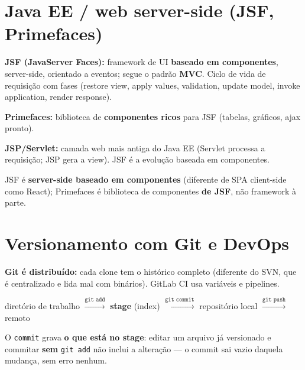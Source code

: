\section{Java EE / web server-side (JSF, Primefaces)}

\textbf{JSF (JavaServer Faces):} framework de UI \textbf{baseado em
componentes}, server-side, orientado a eventos; segue o padrão \textbf{MVC}.
Ciclo de vida de requisição com fases (restore view, apply values,
validation, update model, invoke application, render response).

\textbf{Primefaces:} biblioteca de \textbf{componentes ricos} para JSF
(tabelas, gráficos, ajax pronto).

\textbf{JSP/Servlet:} camada web mais antiga do Java EE (Servlet processa a
requisição; JSP gera a view). JSF é a evolução baseada em componentes.

\begin{pegadinha}
JSF é \textbf{server-side baseado em componentes} (diferente de SPA
client-side como React); Primefaces é biblioteca de componentes \textbf{de
JSF}, não framework à parte.
\end{pegadinha}

\section{Versionamento com Git e DevOps}
\label{sec:git-devops}

\textbf{Git é distribuído:} cada clone tem o histórico completo (diferente
do SVN, que é centralizado e lida mal com binários). GitLab CI usa variáveis
e pipelines.

\begin{conceito}
\begin{center}
diretório de trabalho $\xrightarrow{\texttt{git add}}$ \textbf{stage}
(index) $\xrightarrow{\texttt{git commit}}$ repositório local
$\xrightarrow{\texttt{git push}}$ remoto
\end{center}
O \texttt{commit} grava \textbf{o que está no stage}: editar um arquivo já
versionado e commitar \textbf{sem} \texttt{git add} não inclui a alteração
--- o commit sai vazio daquela mudança, sem erro nenhum.
\end{conceito}

